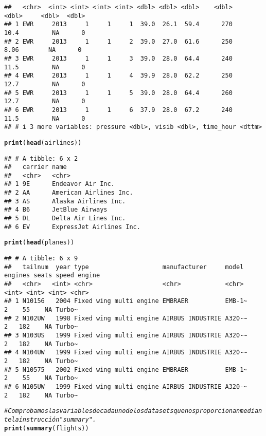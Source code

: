 \documentclass{article}\usepackage[]{graphicx}\usepackage[]{xcolor}
\makeatletter
\newcommand{\hlcom}[1]{\textcolor[rgb]{0.678,0.584,0.686}{\textit{#1}}}%
\newcommand{\hlstd}[1]{\textcolor[rgb]{0.345,0.345,0.345}{#1}}%
\newcommand{\hlkwd}[1]{\textcolor[rgb]{0.737,0.353,0.396}{\textbf{#1}}}%
\newenvironment{kframe}{%
 \def\at@end@of@kframe{}%
 \ifinner\ifhmode%
  \def\at@end@of@kframe{\end{minipage}}%
  \begin{minipage}{\columnwidth}%
 \fi\fi%
 \def\FrameCommand##1{\hskip\@totalleftmargin \hskip-\fboxsep
 \colorbox{shadecolor}{##1}\hskip-\fboxsep
     \hskip-\linewidth \hskip-\@totalleftmargin \hskip\columnwidth}%
 \MakeFramed {\advance\hsize-\width
   \@totalleftmargin\z@ \linewidth\hsize
   \@setminipage}}%
 {\par\unskip\endMakeFramed%
 \at@end@of@kframe}
\newenvironment{knitrout}{}{} %
\makeatother
\begin{document}
\begin{knitrout}
\begin{kframe}
\begin{verbatim}
##   <chr>  <int> <int> <int> <int> <dbl> <dbl> <dbl>    <dbl>      <dbl>     <dbl>  <dbl>
## 1 EWR     2013     1     1     1  39.0  26.1  59.4      270      10.4         NA      0
## 2 EWR     2013     1     1     2  39.0  27.0  61.6      250       8.06        NA      0
## 3 EWR     2013     1     1     3  39.0  28.0  64.4      240      11.5         NA      0
## 4 EWR     2013     1     1     4  39.9  28.0  62.2      250      12.7         NA      0
## 5 EWR     2013     1     1     5  39.0  28.0  64.4      260      12.7         NA      0
## 6 EWR     2013     1     1     6  37.9  28.0  67.2      240      11.5         NA      0
## # i 3 more variables: pressure <dbl>, visib <dbl>, time_hour <dttm>
\end{verbatim}
\begin{alltt}
\hlkwd{print}\hlstd{(}\hlkwd{head}\hlstd{(airlines))}
\end{alltt}
\begin{verbatim}
## # A tibble: 6 x 2
##   carrier name                    
##   <chr>   <chr>                   
## 1 9E      Endeavor Air Inc.       
## 2 AA      American Airlines Inc.  
## 3 AS      Alaska Airlines Inc.    
## 4 B6      JetBlue Airways         
## 5 DL      Delta Air Lines Inc.    
## 6 EV      ExpressJet Airlines Inc.
\end{verbatim}
\begin{alltt}
\hlkwd{print}\hlstd{(}\hlkwd{head}\hlstd{(planes))}
\end{alltt}
\begin{verbatim}
## # A tibble: 6 x 9
##   tailnum  year type                    manufacturer     model  engines seats speed engine
##   <chr>   <int> <chr>                   <chr>            <chr>    <int> <int> <int> <chr> 
## 1 N10156   2004 Fixed wing multi engine EMBRAER          EMB-1~       2    55    NA Turbo~
## 2 N102UW   1998 Fixed wing multi engine AIRBUS INDUSTRIE A320-~       2   182    NA Turbo~
## 3 N103US   1999 Fixed wing multi engine AIRBUS INDUSTRIE A320-~       2   182    NA Turbo~
## 4 N104UW   1999 Fixed wing multi engine AIRBUS INDUSTRIE A320-~       2   182    NA Turbo~
## 5 N10575   2002 Fixed wing multi engine EMBRAER          EMB-1~       2    55    NA Turbo~
## 6 N105UW   1999 Fixed wing multi engine AIRBUS INDUSTRIE A320-~       2   182    NA Turbo~
\end{verbatim}
\begin{alltt}
\hlcom{# Comprobamos las variables de cada uno de los datasets que nos proporcionan mediante la instrucción "summary".}
\hlkwd{print}\hlstd{(}\hlkwd{summary}\hlstd{(flights))}

\end{alltt}
\end{kframe}
\end{knitrout}
\end{document}
